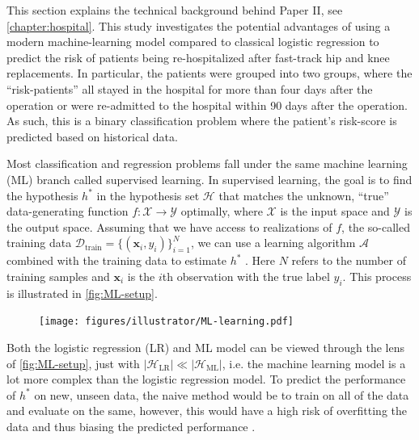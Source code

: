 
This section explains the technical background behind Paper II, see \autoref{chapter:hospital}. This study investigates the potential advantages of using a modern machine-learning model compared to classical logistic regression to predict the risk of patients being re-hospitalized after fast-track hip and knee replacements. In particular, the patients were grouped into two groups, where the ``risk-patients'' all stayed in the hospital for more than four days after the operation or were re-admitted to the hospital within 90 days after the operation. As such, this is a binary classification problem where the patient's risk-score is predicted based on historical data.

Most classification and regression problems fall under the same machine learning (ML) branch called supervised learning. In supervised learning, the goal is to find the hypothesis $h^*$ in the hypothesis set $\mathcal{H}$ that matches the unknown, ``true'' data-generating function $f: \mathcal{X} \rightarrow \mathcal{Y}$ optimally, where $\mathcal{X}$ is the input space and $\mathcal{Y}$ is the output space. Assuming that we have access to realizations of $f$, the so-called training data $\mathcal{D}_\mathrm{train} = \{(\mathbf{x}_i, y_i)\}_{i=1}^N$, we can use a learning algorithm $\mathcal{A}$ combined with the training data to estimate $h^*$ \autocite{abu-mostafaLearningData2012a}. Here $N$ refers to the number of training samples and $\mathbf{x}_i$ is the $i$th observation with the true label $y_i$. This process is illustrated in \autoref{fig:ML-setup}.

\begin{figure}[htbp]
    \centering
    \texttt{[image: figures/illustrator/ML-learning.pdf]}
\end{figure}

Both the logistic regression (LR) and ML model can be viewed through the lens of \autoref{fig:ML-setup}, just with $|\mathcal{H}_\mathrm{LR}| \ll |\mathcal{H}_\mathrm{ML}|$, i.e. the machine learning model is a lot more complex than the logistic regression model. To predict the performance of $h^*$ on new, unseen data, the naive method would be to train on all of the data and evaluate on the same, however, this would have a high risk of overfitting the data and thus biasing the predicted performance \autocite{abu-mostafaLearningData2012a}.

